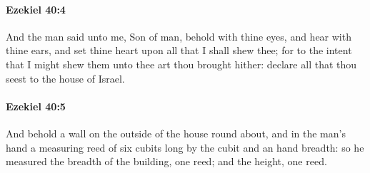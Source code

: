 		\paragraph{Ezekiel 40:4} %
			\label{EZEKIEL-40-4}

			And the man said unto me, Son of man, behold with thine eyes, and hear with thine ears, and set thine heart upon all that I shall shew thee; for to the intent that I might shew them unto thee art thou brought hither: declare all that thou seest to the house of Israel.


		\paragraph{Ezekiel 40:5} %
			\label{EZEKIEL-40-5}

			And behold a wall on the outside of the house round about, and in the man’s hand a measuring reed of six cubits long by the cubit and an hand breadth: so he measured the breadth of the building, one reed; and the height, one reed.

